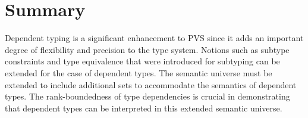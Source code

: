 \documentclass [12pt,twoside]{cslreport}
\newcommand{\aro}{\mathord\rightarrow} %
\newcommand{\funtype}[2]{[#1 \aro #2]}
\newcommand{\tupletype}[1]{[#1]}
\newcommand{\Mgamma}[1]{{\mathcal M}(\Gamma\vbar\gamma)(#1)}
\newcommand{\ttvar}{\mathtt{VAR}}
\newcommand{\vbar}{\ |\ }
\begin{document}
\begin{comment}
\begin{enumerate}
\item $A\equiv s$: Same as in Theorem~\ref{simple-type-semantics}\@.
%
\item $A\equiv \funtype{y : C}{D}$: We have by the induction hypothesis
that $\Mgamma{C}\in U$ and for any $z\in \Mgamma{C}$, $\mathcal{M}(\Gamma,
y:\ttvar~C\vbar \gamma\{y\gets z\})(D) \in U$\@.  We also have by the
induction hypothesis with $D$ for $B$ that there is an $i$ such that
the function $F$ mapping $z\in \Mgamma{C}$ to $\mathcal{M}(\Gamma,
y:\ttvar~C\vbar \gamma\{y\gets z\})(D)$ is in $W_i$\@.
Since, by Definition~\ref{defn:meaning function with dependent types},
$\Mgamma{A} = \Pi{F}$, we have $\Mgamma{A}$ in $U_{i+1}$ and hence $U$\@.
%
\item $A\equiv \tupletype{x_1 : T_1,\ldots, x_n : T_n}$:  We have by the
induction hypothesis that $\Mgamma{T_1}\in U$ and that there is an $i$
such that 
the function $F$ mapping $z$ in $\Mgamma{T_1}$ to
$\mathcal{M}(\Gamma, x: \ttvar~T_1\vbar \gamma\{x\gets z\})(\tupletype{x_2:
T_2, \ldots x_n: T_n})$  is in $W_i$\@.  Since, by
Definition~\ref{defn:meaning function with dependent types},
$\Mgamma{A} = \Sigma{F}$,
we have by Definition~\ref{defn:type universe with dependent types},
that $\Mgamma{A}\in U_{i+1}$ and hence $\Mgamma{A}\in U$\@.
%
\item $A\equiv \{y : T | a\}$: Same as in
Theorem~\ref{subtype-type-semantics}\@.
%
\item $B \equiv s$:  Let $j$ be the rank of $\Mgamma{A}$\@.  
Then $\mathcal{M}(\Gamma, x : \ttvar~A\vbar \gamma\{x\gets
z\})(B)$ is just $\gamma(s)$ and by Definition~ref{defn:satisfaction},
we have some $k$ such that $\gamma(s)\in U_k$\@.  Let $i$ be the maximum
of $j$ and $k$, we have $F\in U_i$\@.
%
\item $B\equiv \funtype{x: C}{D}$:  
\end{enumerate}
\end{proof}
\end{comment}

\section{Summary}

Dependent typing is a significant enhancement to PVS since it adds
an important degree of flexibility and precision to the type system.
Notions  such as subtype constraints and type equivalence
that were introduced for subtyping can be extended for the case of
dependent types.  The semantic universe must be extended to include
additional sets to accommodate the semantics of dependent types.
The rank-boundedness of type dependencies is crucial in demonstrating that
dependent types can be interpreted in this extended semantic universe.
  
\end{document}

